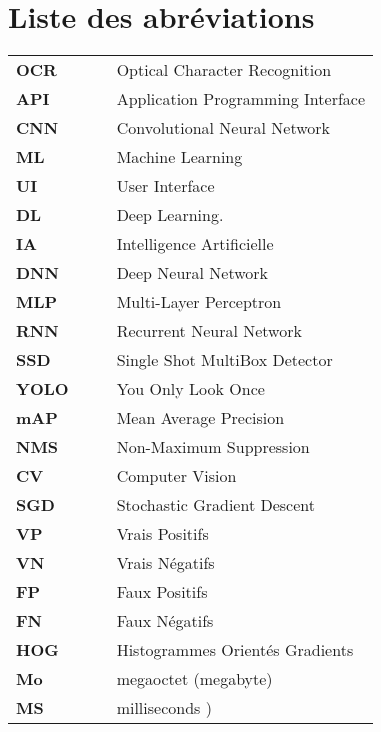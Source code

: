 \chapter*{Liste des abréviations}

\begin{tabular}{llll}

\textbf{OCR} & & & Optical Character Recognition\\
\textbf{API} & & & Application Programming Interface\\
\textbf{CNN} & & & Convolutional Neural Network\\
\textbf{ML} & & & Machine Learning\\
\textbf{UI} & & & User Interface\\
\textbf{DL} & & & Deep Learning.\\
\textbf{IA} & & & Intelligence Artificielle\\
\textbf{DNN} & & & Deep Neural Network\\
\textbf{MLP} & & & Multi-Layer Perceptron\\
\textbf{RNN} & & & Recurrent Neural Network\\
\textbf{SSD} & & & Single Shot MultiBox Detector\\
\textbf{YOLO} & & & You Only Look Once \\
\textbf{mAP} & & & Mean Average Precision \\
\textbf{NMS} & & & Non-Maximum Suppression  \\
\textbf{CV} & & & Computer Vision\\
\textbf{SGD} & & & Stochastic Gradient Descent\\
\textbf{VP} & & & Vrais Positifs\\
\textbf{VN} & & & Vrais Négatifs \\
\textbf{FP} & & & Faux Positifs\\
\textbf{FN} & & & Faux Négatifs \\
\textbf{HOG} & & & Histogrammes Orientés Gradients\\
\textbf{Mo} & & & megaoctet (megabyte)\\
\textbf{MS} & & & milliseconds )\\

\end{tabular}